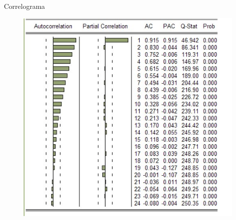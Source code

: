 \begin{frame}{Correlograma}
	\centering
		\begin{figure}
			\includegraphics[width = 0.75\linewidth]{fig/figure5.jpg}
		\end{figure}
\end{frame}